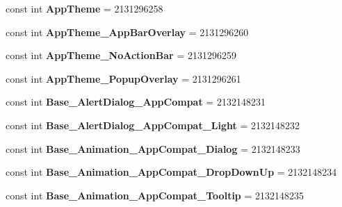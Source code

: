 \begin{DoxyCompactItemize}
const int {\bfseries App\+Theme} = 2131296258
\item 
\mbox{\label{classst_delivery_1_1_resource_1_1_style_accb1a3e4163a2ff1289994dab6c3db27}} 
const int {\bfseries App\+Theme\+\_\+\+App\+Bar\+Overlay} = 2131296260
\item 
\mbox{\label{classst_delivery_1_1_resource_1_1_style_ac8293a604d12ad523a410228cdb0b28a}} 
const int {\bfseries App\+Theme\+\_\+\+No\+Action\+Bar} = 2131296259
\item 
\mbox{\label{classst_delivery_1_1_resource_1_1_style_ae263c0da702e7cdb3eb28cf11777e806}} 
const int {\bfseries App\+Theme\+\_\+\+Popup\+Overlay} = 2131296261
\item 
\mbox{\label{classst_delivery_1_1_resource_1_1_style_a12d91330ca2c14ab88083597bea41f09}} 
const int {\bfseries Base\+\_\+\+Alert\+Dialog\+\_\+\+App\+Compat} = 2132148231
\item 
\mbox{\label{classst_delivery_1_1_resource_1_1_style_ac7961dfa7d022b5007d5f879cf721a76}} 
const int {\bfseries Base\+\_\+\+Alert\+Dialog\+\_\+\+App\+Compat\+\_\+\+Light} = 2132148232
\item 
\mbox{\label{classst_delivery_1_1_resource_1_1_style_acb1b1778a812266892444755b35f4de5}} 
const int {\bfseries Base\+\_\+\+Animation\+\_\+\+App\+Compat\+\_\+\+Dialog} = 2132148233
\item 
\mbox{\label{classst_delivery_1_1_resource_1_1_style_a660fda0a8b02c46ae38dd7a864effc8d}} 
const int {\bfseries Base\+\_\+\+Animation\+\_\+\+App\+Compat\+\_\+\+Drop\+Down\+Up} = 2132148234
\item 
\mbox{\label{classst_delivery_1_1_resource_1_1_style_a106df50a2574e95bf69c8535a70bb5a7}} 
const int {\bfseries Base\+\_\+\+Animation\+\_\+\+App\+Compat\+\_\+\+Tooltip} = 2132148235
\item 
\mbox{\label{classst_delivery_1_1_resource_1_1_style_aec59ec21595ea836798a0f0e44e2c857}} 

\end{DoxyCompactItemize}
